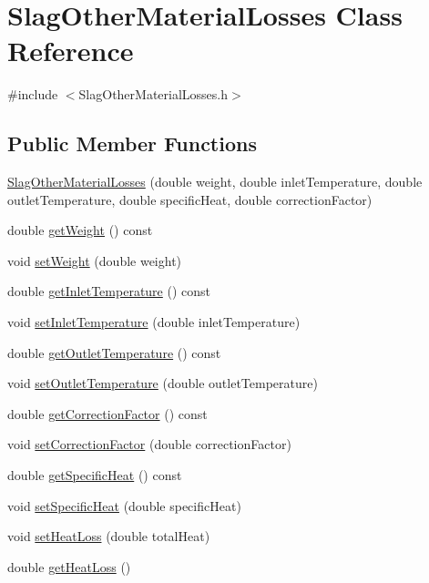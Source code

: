 \hypertarget{class_slag_other_material_losses}{}\section{Slag\+Other\+Material\+Losses Class Reference}
\label{class_slag_other_material_losses}


{\ttfamily \#include $<$Slag\+Other\+Material\+Losses.\+h$>$}

\subsection*{Public Member Functions}
\begin{DoxyCompactItemize}
\item 
\hyperlink{class_slag_other_material_losses_a8b09bf5dd916a6c7df45b5bf2849e6b8}{Slag\+Other\+Material\+Losses} (double weight, double inlet\+Temperature, double outlet\+Temperature, double specific\+Heat, double correction\+Factor)
\item 
double \hyperlink{class_slag_other_material_losses_a9b62b86eb4ec919d70dd8899ef5d3513}{get\+Weight} () const
\item 
void \hyperlink{class_slag_other_material_losses_a230a178f2ead59cd498b620e4bb4910f}{set\+Weight} (double weight)
\item 
double \hyperlink{class_slag_other_material_losses_aebd0f1b7d6c4bf0deb8ce8a86c5a80a7}{get\+Inlet\+Temperature} () const
\item 
void \hyperlink{class_slag_other_material_losses_a47bb0a61de501e3e9b7bd2bf2651eb8c}{set\+Inlet\+Temperature} (double inlet\+Temperature)
\item 
double \hyperlink{class_slag_other_material_losses_a1c48f1a70aaf030451b7e350f3d6cd18}{get\+Outlet\+Temperature} () const
\item 
void \hyperlink{class_slag_other_material_losses_afae6aafff94d02926135fabf20a87070}{set\+Outlet\+Temperature} (double outlet\+Temperature)
\item 
double \hyperlink{class_slag_other_material_losses_a920bbc2da2ba90416e86573830eee2cb}{get\+Correction\+Factor} () const
\item 
void \hyperlink{class_slag_other_material_losses_a2aa985511888327bed6039da79c8958a}{set\+Correction\+Factor} (double correction\+Factor)
\item 
double \hyperlink{class_slag_other_material_losses_aa68e92bdf836a4112c55344f897f2649}{get\+Specific\+Heat} () const
\item 
void \hyperlink{class_slag_other_material_losses_a05488997f264a74afe3229250a286f92}{set\+Specific\+Heat} (double specific\+Heat)
\item 
void \hyperlink{class_slag_other_material_losses_a33d59aed5492ec2912615e93b6ff273e}{set\+Heat\+Loss} (double total\+Heat)
\item 
double \hyperlink{class_slag_other_material_losses_a4c96a826ef6da38f4c27f7efd8b4a7ba}{get\+Heat\+Loss} ()
\end{DoxyCompactItemize}


